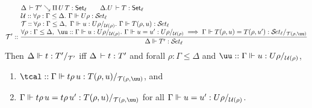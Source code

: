 \documentclass[acmlarge,review,anonymous]{acmart}\settopmatter{printfolios=true}
\begin{document}
\begin{caselist}
\nextcase
\[
  \T' ::
  \rul{\Delta \der T' \evalsto \piT U T : \Set[\ell] \qquad \cext \Delta U \der T : \Set[\ell] \\ \relax
      \U :: \forall \rho : \Gamma \leq \Delta.~ \sty{\Gamma}{U\rho} {\ell} \\ \relax
      \T :: \forall \rho : \Gamma \leq \Delta,~\sttmd \Gamma u {U\rho} {\U(\rho)}.~
        \sty \Gamma {T(\rho,u)} \ell \\
      \forall \rho : \Gamma \leq \Delta,~ \uu :: \sttmd \Gamma u {U\rho} {\U(\rho)}.~
        \sttmeqd \Gamma u {u'} {U\rho} {\U(\rho)} {\uu} \implies
        \steqd \Gamma {T(\rho,u)} {T(\rho,u')} \ell {\T(\rho,\uu)}
    }{\sty \Delta {T'} \ell}
\]
Then $\Delta \Vdash t : T' /_{\mathcal{T}'}$ iff $\Delta \,\vdash t : T'$ and
forall $\rho : \Gamma \leq \Delta$ and $\uu :: \sttmd \Gamma u {U\rho} {\U(\rho)}$,
\begin{enumerate}
\item $\tcal :: \sttmd \Gamma {t\rho\,u} {T(\rho,u)} {\T(\rho,\uu)}$, and
\item $\sttmeqd \Gamma {t\rho\,u} {t\rho\,u'} {T(\rho,u)} {\T(\rho,\uu)} {\tcal}$ for all
  $\sttmeqd \Gamma u {u'} {U\rho} {\U(\rho)} {\uu}$.
\end{enumerate}

\end{caselist}
\end{document}
